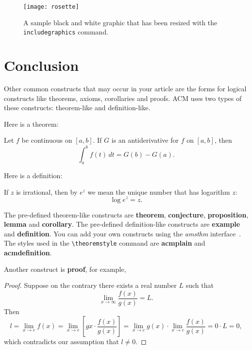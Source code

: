 \begin{figure}
\texttt{[image: rosette]}
\caption{A sample black and white graphic that has
been resized with the \texttt{includegraphics} command.}
\end{figure}

\section{Conclusion}

Other common constructs that may occur in your article are the forms
for logical constructs like theorems, axioms, corollaries and proofs.
ACM uses two types of these constructs:  theorem-like and
definition-like.

Here is a theorem:
\begin{theorem}
  Let $f$ be continuous on $[a,b]$.  If $G$ is
  an antiderivative for $f$ on $[a,b]$, then
  \begin{displaymath}
    \int^b_af(t)\,dt = G(b) - G(a).
  \end{displaymath}
\end{theorem}

Here is a definition:
\begin{definition}
  If $z$ is irrational, then by $e^z$ we mean the
  unique number that has
  logarithm $z$:
  \begin{displaymath}
    \log e^z = z.
  \end{displaymath}
\end{definition}

The pre-defined theorem-like constructs are \textbf{theorem},
\textbf{conjecture}, \textbf{proposition}, \textbf{lemma} and
\textbf{corollary}.  The pre-defined de\-fi\-ni\-ti\-on-like constructs are
\textbf{example} and \textbf{definition}.  You can add your own
constructs using the \textsl{amsthm} interface~\cite{Amsthm15}.  The
styles used in the \verb|\theoremstyle| command are \textbf{acmplain}
and \textbf{acmdefinition}.

Another construct is \textbf{proof}, for example,

\begin{proof}
  Suppose on the contrary there exists a real number $L$ such that
  \begin{displaymath}
    \lim_{x\rightarrow\infty} \frac{f(x)}{g(x)} = L.
  \end{displaymath}
  Then
  \begin{displaymath}
    l=\lim_{x\rightarrow c} f(x)
    = \lim_{x\rightarrow c}
    \left[ g{x} \cdot \frac{f(x)}{g(x)} \right ]
    = \lim_{x\rightarrow c} g(x) \cdot \lim_{x\rightarrow c}
    \frac{f(x)}{g(x)} = 0\cdot L = 0,
  \end{displaymath}
  which contradicts our assumption that $l\neq 0$.
\end{proof}

